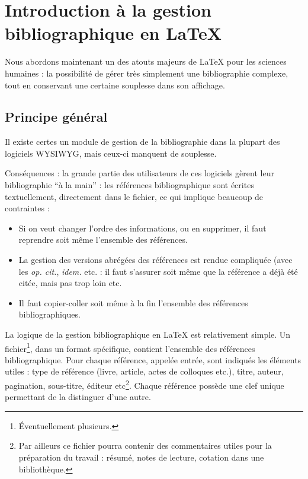\chapter[Introduction]{Introduction à la gestion bibliographique en \LaTeX{}}
\begin{prealable}
Nous abordons maintenant un des atouts majeurs de \LaTeX{} pour les sciences humaines : la possibilité de gérer très simplement une bibliographie complexe, tout en conservant une certaine souplesse dans son affichage.

\end{prealable}
\section{Principe général}



Il existe certes un module de gestion de la bibliographie dans la plupart des logiciels WYSIWYG, mais ceux-ci manquent de souplesse.

Conséquences : la grande partie des utilisateurs de ces logiciels gèrent leur bibliographie \enquote{à la main} : les références bibliographique sont écrites textuellement, directement dans le fichier, ce qui implique beaucoup de contraintes  :
\begin{itemize}
\item Si on veut changer l'ordre des informations, ou en supprimer, il faut reprendre soit même l'ensemble des références.
\item La gestion des versions abrégées des références est rendue compliquée (avec les \emph{op. cit.}, \emph{idem.} etc. :  il faut s'assurer soit même que la référence a déjà été citée, mais pas trop loin etc. 
\item Il faut copier-coller soit même à la fin l'ensemble des références bibliographiques. 
\end{itemize}

La logique de la gestion bibliographique en \LaTeX{} est relativement simple. Un fichier\footnote{Éventuellement plusieurs.}, dans un format spécifique, contient l'ensemble des références bibliographique. Pour chaque référence, appelée entrée, sont indiqués les éléments utiles :  type de référence (livre, article, actes de colloques etc.), titre, auteur, pagination, sous-titre, éditeur etc\footnote{Par ailleurs ce fichier pourra contenir des commentaires utiles pour la préparation du travail : résumé, notes de lecture, cotation dans une bibliothèque.}. Chaque référence possède une clef unique permettant de la distinguer d'une autre.

